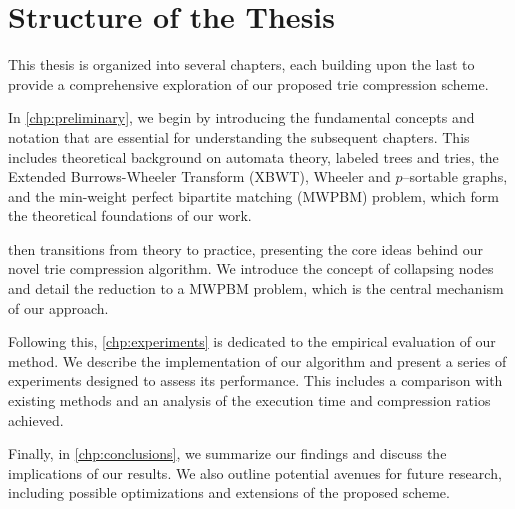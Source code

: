 \section{Structure of the Thesis}
This thesis is organized into several chapters, each building upon the last to provide a comprehensive exploration of our proposed trie compression scheme.

In \cref{chp:preliminary}, we begin by introducing the fundamental concepts and notation that are essential for understanding the subsequent chapters. This includes theoretical background on automata theory, labeled trees and tries, the Extended Burrows-Wheeler Transform (XBWT), Wheeler and $p$--sortable graphs, and the min-weight perfect bipartite matching (MWPBM) problem, which form the theoretical foundations of our work.

 then transitions from theory to practice, presenting the core ideas behind our novel trie compression algorithm. We introduce the concept of collapsing nodes and detail the reduction to a MWPBM problem, which is the central mechanism of our approach.

Following this, \cref{chp:experiments} is dedicated to the empirical evaluation of our method. We describe the implementation of our algorithm and present a series of experiments designed to assess its performance. This includes a comparison with existing methods and an analysis of the execution time and compression ratios achieved.

Finally, in \cref{chp:conclusions}, we summarize our findings and discuss the implications of our results. We also outline potential avenues for future research, including possible optimizations and extensions of the proposed scheme.